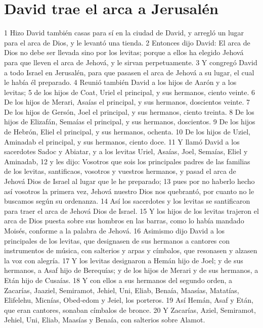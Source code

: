 \section*{David trae el arca a Jerusalén}

 

1 Hizo David también casas para sí en la ciudad de David, y arregló un lugar para el arca de Dios, y le levantó una tienda.
2 Entonces dijo David: El arca de Dios no debe ser llevada sino por los levitas; porque a ellos ha elegido Jehová para que lleven el arca de Jehová, y le sirvan perpetuamente. 
3 Y congregó David a todo Israel en Jerusalén, para que pasasen el arca de Jehová a su lugar, el cual le había él preparado.
4 Reunió también David a los hijos de Aarón y a los levitas;
5 de los hijos de Coat, Uriel el principal, y sus hermanos, ciento veinte.
6 De los hijos de Merari, Asaías el principal, y sus hermanos, doscientos veinte.
7 De los hijos de Gersón, Joel el principal, y sus hermanos, ciento treinta.
8 De los hijos de Elizafán, Semaías el principal, y sus hermanos, doscientos.
9 De los hijos de Hebrón, Eliel el principal, y sus hermanos, ochenta.
10 De los hijos de Uziel, Aminadab el principal, y sus hermanos, ciento doce.
11 Y llamó David a los sacerdotes Sadoc y Abiatar, y a los levitas Uriel, Asaías, Joel, Semaías, Eliel y Aminadab,
12 y les dijo: Vosotros que sois los principales padres de las familias de los levitas, santificaos, vosotros y vuestros hermanos, y pasad el arca de Jehová Dios de Israel al lugar que le he preparado;
13 pues por no haberlo hecho así vosotros la primera vez, Jehová nuestro Dios nos quebrantó, por cuanto no le buscamos según su ordenanza.
14 Así los sacerdotes y los levitas se santificaron para traer el arca de Jehová Dios de Israel.
15 Y los hijos de los levitas trajeron el arca de Dios puesta sobre sus hombros en las barras, como lo había mandado Moisés, conforme a la palabra de Jehová. 
16 Asimismo dijo David a los principales de los levitas, que designasen de sus hermanos a cantores con instrumentos de música, con salterios y arpas y címbalos, que resonasen y alzasen la voz con alegría.
17 Y los levitas designaron a Hemán hijo de Joel; y de sus hermanos, a Asaf hijo de Berequías; y de los hijos de Merari y de sus hermanos, a Etán hijo de Cusaías.
18 Y con ellos a sus hermanos del segundo orden, a Zacarías, Jaaziel, Semiramot, Jehiel, Uni, Eliab, Benaía, Maasías, Matatías, Elifelehu, Micnías, Obed-edom y Jeiel, los porteros.
19 Así Hemán, Asaf y Etán, que eran cantores, sonaban címbalos de bronce.
20 Y Zacarías, Aziel, Semiramot, Jehiel, Uni, Eliab, Maasías y Benaía, con salterios sobre Alamot.
